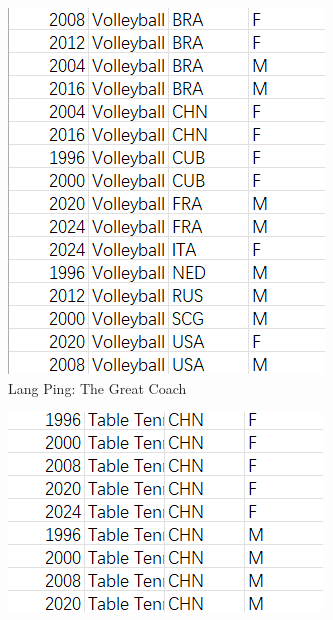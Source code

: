 \begin{figure}[h]
    \centering
    \begin{subfigure}[b]{0.32\textwidth}
        \centering
        \includegraphics[width=\textwidth]{../figures/lang_ping.png}
        \caption{Lang Ping: The Great Coach}
        \label{fig:lang_ping1}
    \end{subfigure}
    \begin{subfigure}[b]{0.32\textwidth}
        \centering
        \includegraphics[width=\textwidth]{../figures/chn_tt.png}

\end{subfigure}
\end{figure}
